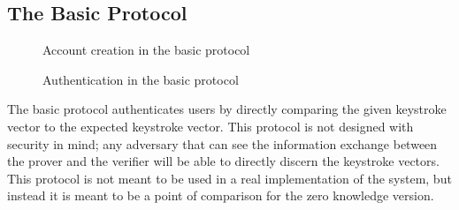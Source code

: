 \documentclass[11pt]{article}
\begin{document}
\subsection{The Basic Protocol}

\begin{figure}[h!]
\centering
{}
\caption{Account creation in the basic protocol}
\label{fig:basic_new}
\end{figure}

\begin{figure}[h!]
\centering
{}
\caption{Authentication in the basic protocol}
\label{fig:basic_auth}
\end{figure}
The basic protocol authenticates users by directly comparing the given keystroke vector to the expected keystroke vector. This protocol is not designed with security in mind; any adversary that can see the information exchange between the prover and the verifier will be able to directly discern the keystroke vectors. This protocol is not meant to be used in a real implementation of the system, but instead it is meant to be a point of comparison for the zero knowledge version.
\end{document}
